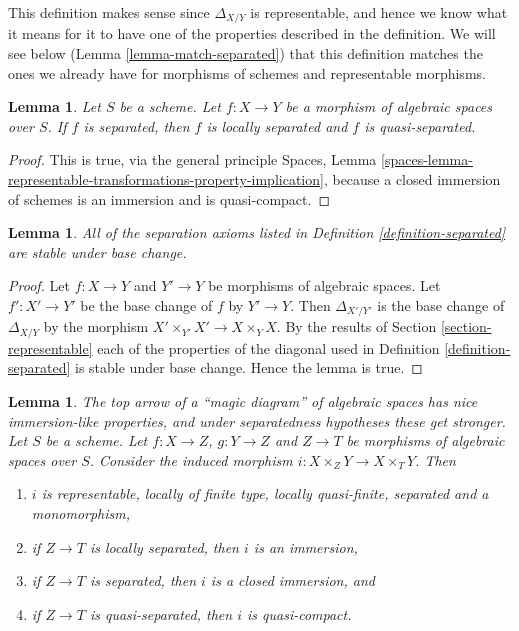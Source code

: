 \documentclass{stacks-project}
\newenvironment{slogan}{\comment}{\endcomment}
\theoremstyle{plain}
\newtheorem{lemma}[subsection]{Lemma}
\theoremstyle{definition}
\theoremstyle{remark}
\numberwithin{equation}{subsection}
\begin{document}
\noindent
This definition makes sense since $\Delta_{X/Y}$ is representable,
and hence we know what it means for it to have one of the properties
described in the definition. We will see below
(Lemma \ref{lemma-match-separated}) that this definition matches the ones
we already have for morphisms of schemes and representable morphisms.

\begin{lemma}
\label{lemma-trivial-implications}
Let $S$ be a scheme. Let $f : X \to Y$ be a morphism of algebraic spaces
over $S$. If $f$ is separated, then $f$ is locally separated and
$f$ is quasi-separated.
\end{lemma}

\begin{proof}
This is true, via the general principle
Spaces,
Lemma \ref{spaces-lemma-representable-transformations-property-implication},
because a closed immersion of schemes is an immersion and is quasi-compact.
\end{proof}

\begin{lemma}
\label{lemma-base-change-separated}
All of the separation axioms listed in Definition \ref{definition-separated}
are stable under base change.
\end{lemma}

\begin{proof}
Let $f : X \to Y$ and $Y' \to Y$ be morphisms of algebraic spaces.
Let $f' : X' \to Y'$ be the base change of $f$ by $Y' \to Y$. Then
$\Delta_{X'/Y'}$ is the base change of $\Delta_{X/Y}$ by
the morphism $X' \times_{Y'} X' \to X \times_Y X$. By the results of
Section \ref{section-representable}
each of the properties of the diagonal used in
Definition \ref{definition-separated}
is stable under base change. Hence the lemma is true.
\end{proof}

\begin{lemma}
\label{lemma-fibre-product-after-map}
\begin{slogan}
The top arrow of a ``magic diagram'' of algebraic spaces has nice
immersion-like properties, and under separatedness hypotheses
these get stronger.
\end{slogan}
Let $S$ be a scheme. Let $f : X \to Z$, $g : Y \to Z$ and $Z \to T$
be morphisms of algebraic spaces over $S$. Consider the induced morphism
$i : X \times_Z Y \to X \times_T Y$. Then
\begin{enumerate}
\item $i$ is representable, locally of finite type, locally quasi-finite,
separated and a monomorphism,
\item if $Z \to T$ is locally separated, then $i$ is an immersion,
\item if $Z \to T$ is separated, then $i$ is a closed immersion, and
\item if $Z \to T$ is quasi-separated, then $i$ is quasi-compact.
\end{enumerate}
\end{lemma}
\end{document}

